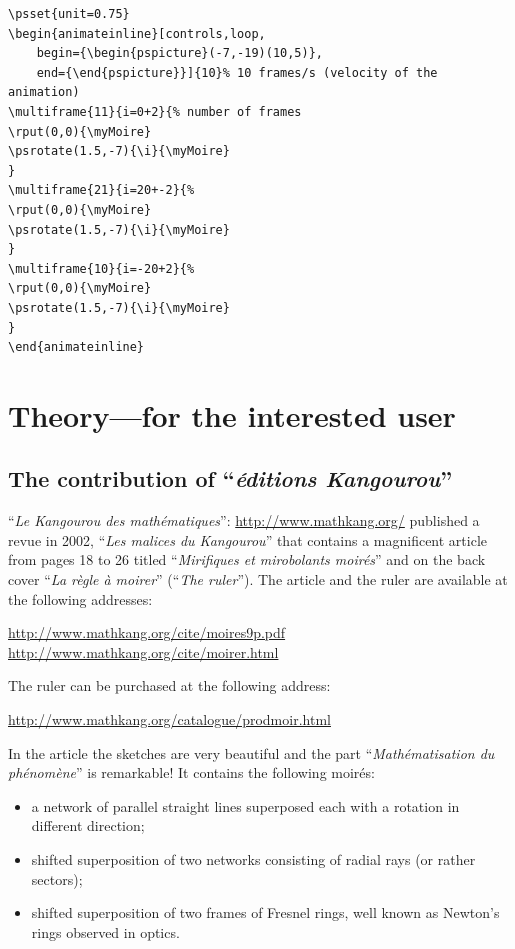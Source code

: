 \documentclass[%
    11pt,
    english,
    BCOR10mm,
    DIV12,
    bibliography=totoc,
    parskip=false,
    fleqn,
    smallheadings,
    headexclude,
    footexclude,
    oneside,
    dvipsnames,
    svgnames,
    x11names
]{pst-doc}
\begin{document}
{{{{\begin{verbatim}
\psset{unit=0.75}
\begin{animateinline}[controls,loop,
    begin={\begin{pspicture}(-7,-19)(10,5)},
    end={\end{pspicture}}]{10}% 10 frames/s (velocity of the animation)
\multiframe{11}{i=0+2}{% number of frames
\rput(0,0){\myMoire}
\psrotate(1.5,-7){\i}{\myMoire}
}
\multiframe{21}{i=20+-2}{%
\rput(0,0){\myMoire}
\psrotate(1.5,-7){\i}{\myMoire}
}
\multiframe{10}{i=-20+2}{%
\rput(0,0){\myMoire}
\psrotate(1.5,-7){\i}{\myMoire}
}
\end{animateinline}
\end{verbatim}}


\newpage


\section{Theory---for the interested user}\label{sec:theory}

\subsection{The contribution of ``\textit{éditions Kangourou}''}

``\textit{Le Kangourou des mathématiques}'': \textcolor{orange}{\url{http://www.mathkang.org/}} published a revue in 2002, ``\textit{Les malices du Kangourou}'' that contains a magnificent article from pages 18 to 26 titled ``\textit{Mirifiques et mirobolants moirés}'' and on the back cover ``\textit{La règle à moirer}'' (``\textit{The ruler}''). The article and the ruler are available at the following addresses:
\begin{center}
\url{http://www.mathkang.org/cite/moires9p.pdf}
\\
\url{http://www.mathkang.org/cite/moirer.html}
\end{center}
The ruler can be purchased at the following address:
\begin{center}
\url{http://www.mathkang.org/catalogue/prodmoir.html}
\end{center}
In the article the sketches are very beautiful and the part ``\textit{Mathématisation du phénomène}'' is remarkable! It contains the following moirés:
\begin{itemize}
  \item a network of parallel straight lines superposed each with a rotation in different direction;
  \item shifted superposition of two networks consisting of radial rays (or rather sectors);
  \item shifted superposition of two frames of Fresnel rings, well known as Newton's rings observed in optics.
\end{itemize}


}}}
\end{document}
